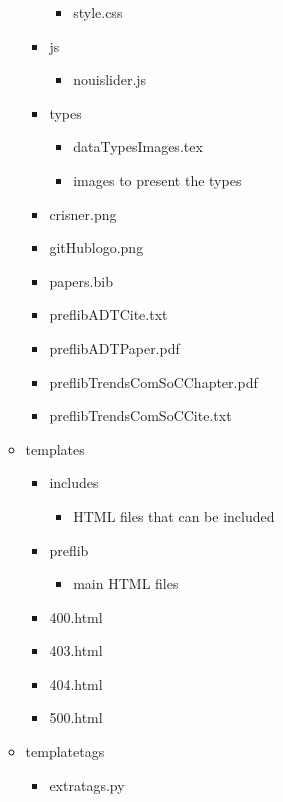 \documentclass{report}
\begin{document}
\begin{figure}
\begin{multicols}{2}
\begin{itemize}
\begin{itemize}
\begin{itemize}
\begin{itemize}
							\item[\faFileO] style.css
						\end{itemize}
						\item[\faFolderO] js 
						\begin{itemize}
							\item[\faFileO] nouislider.js
						\end{itemize}
						\item[\faFolderO] types
						\begin{itemize}
							\item[\faFileO] dataTypesImages.tex
							\item[\faFilesO] images to present the types
						\end{itemize}
						\item[\faFileO] crisner.png
						\item[\faFileO] gitHublogo.png
						\item[\faFileO] papers.bib
						\item[\faFileO] preflibADTCite.txt
						\item[\faFileO] preflibADTPaper.pdf
						\item[\faFileO] preflibTrendsComSoCChapter.pdf
						\item[\faFileO] preflibTrendsComSoCCite.txt
					\end{itemize}
					\item[\faFolderO] templates
					\begin{itemize}
						\item[\faFolderO] includes
						\begin{itemize}
							\item[\faFilesO] HTML files that can be included
						\end{itemize}
						\item[\faFolderO] preflib
						\begin{itemize}
							\item[\faFilesO] main HTML files
						\end{itemize}
						\item[\faFileO] 400.html
						\item[\faFileO] 403.html
						\item[\faFileO] 404.html
						\item[\faFileO] 500.html
					\end{itemize}
					\item[\faFolderO] templatetags
					\begin{itemize}
						\item[\faFileO] extratags.py

\end{itemize}
\end{itemize}
\end{itemize}
\end{multicols}
\end{figure}
\end{document}

